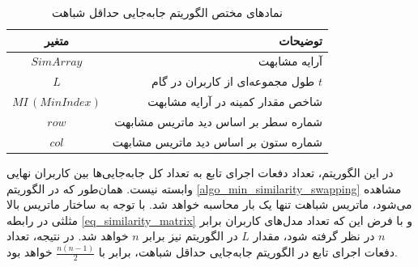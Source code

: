 \begin{LTR}
	\begin{algorithm}[t]
		\begin{RTL}
			\caption{%
				جابه‌جایی حداقل شباهت
			}
			\label{algo_min_similarity_swapping}
		\end{RTL}
		
		\begin{latin}
		\end{latin}
	\end{algorithm}
\end{LTR}



\begin{table}[h]
	\centering
	\caption{نمادهای مختص الگوریتم جابه‌جایی حداقل شباهت}
	\label{tabel_MinSimilaritySwapNotations}
	\begin{tabular}{cr}
		\hline
		متغیر & توضیحات \\
		\hline
		$SimArray$ & آرایه مشابهت \\
		$L$ & طول مجموعه‌ای از کاربران در گام $t$ \\
		$MI \, (MinIndex)$ & شاخص مقدار کمینه در آرایه مشابهت \\
		$row$ & شماره سطر بر اساس دید ماتریس مشابهت \\
		$col$ & شماره ستون بر اساس دید ماتریس مشابهت
	\end{tabular}
\end{table}




در این الگوریتم، تعداد دفعات اجرای تابع
به تعداد کل جابه‌جایی‌ها بین کاربران نهایی وابسته نیست. همان‌طور که در الگوریتم
\ref{algo_min_similarity_swapping}
مشاهده می‌شود، ماتریس شباهت تنها یک بار محاسبه خواهد شد. با توجه به ساختار ماتریس بالا مثلثی در رابطه
\ref{eq_similarity_matrix}
و با فرض این که تعداد مدل‌های کاربران برابر \(n\) در نظر گرفته شود، مقدار \(L\) در الگوریتم نیز برابر \(n\) خواهد شد.
در نتیجه، تعداد دفعات اجرای تابع
در الگوریتم جابه‌جایی حداقل شباهت، برابر با \(\frac{n(n-1)}{2}\) خواهد بود.


